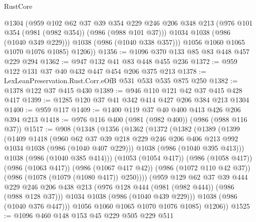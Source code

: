 \begin{lexlean}{RustCore}
\begin{coremodule}
            @1304
            (@959
              @102
              @62
              @37
              @39
              @354
              @229
              @246
              @206
              @348
              @213
              (@976 @101 @354 (@981 (@982 @354)) (@986 (@988 @101 @37)))
              @1034
              @1038
              (@986 (@1040 @349 @229)))
            @1038
            (@986 (@1040 @338 @357)))
          @1056
          @1060
          @1065
          @1070
          @1076
          @1085)
        @1206))
@1356 := @1096 @370 @133 @85 @83 @448 @457 @229 @294
@1362 := @947 @132 @41 @83 @448 @455 @236
@1372 := @959 @122 @131 @37 @40 @432 @447 @454 @206 @375 @213
@1378 := LexLeanPreservation.Rust.Corr.eOfB @531 @533 @535 @875 @250
@1382 := @1378 @122 @37 @415 @430
@1389 := @946 @110 @121 @42 @37 @415 @428 @417
@1399 := @1285 @120 @37 @41 @342 @414 @427 @206 @384 @213 @1304
@1400 := @959 @117
@1409 := @1400 @119 @37 @40 @400 @413 @426 @206 @394 @213
@1418 := @976 @116 @400 (@981 (@982 @400)) (@986 (@988 @116 @37))
@1517 := @908
    (@1348
      (@1356
        (@1362
          (@1372
            (@1382
              (@1389
                (@1399
                  (@1409
                    @1418
                    (@960
                      @62
                      @37
                      @39
                      @218
                      @229
                      @246
                      @206
                      @406
                      @213
                      @992
                      @1034
                      @1038
                      (@986 (@1040 @407 @229)))
                    @1038
                    (@986 (@1040 @395 @413)))
                  @1038
                  (@986 (@1040 @385 @414)))
                (@1053 (@1054 @417))
                (@986 (@1058 @417))
                (@986 (@1063 @417))
                (@986 (@1067 @417 @42))
                (@986 (@1072 @110 @42 @37))
                (@986 (@1078 (@1079 (@1080 @417)) @250))))
            (@959
              @129
              @62
              @37
              @39
              @444
              @229
              @246
              @206
              @438
              @213
              (@976 @128 @444 (@981 (@982 @444)) (@986 (@988 @128 @37)))
              @1034
              @1038
              (@986 (@1040 @439 @229)))
            @1038
            (@986 (@1040 @376 @447)))
          @1056
          @1060
          @1065
          @1070
          @1076
          @1085)
        @1206))
@1525 := @1096 @460 @148 @153 @45 @229 @505 @229 @511

\end{coremodule}
\end{lexlean}
